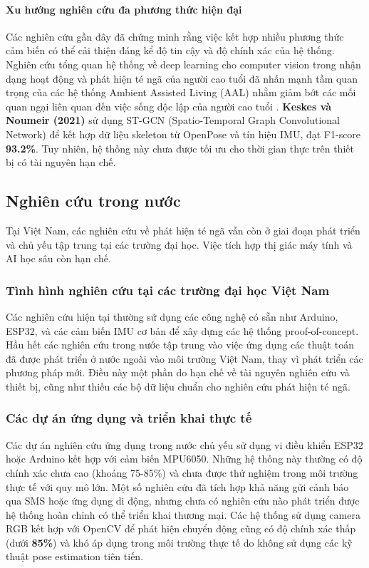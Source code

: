 \paragraph{Xu hướng nghiên cứu đa phương thức hiện đại}
Các nghiên cứu gần đây đã chứng minh rằng việc kết hợp nhiều phương thức cảm biến có thể cải thiện đáng kể độ tin cậy và độ chính xác của hệ thống. Nghiên cứu tổng quan hệ thống về deep learning cho computer vision trong nhận dạng hoạt động và phát hiện té ngã của người cao tuổi đã nhấn mạnh tầm quan trọng của các hệ thống Ambient Assisted Living (AAL) nhằm giảm bớt các mối quan ngại liên quan đến việc sống độc lập của người cao tuổi \cite{keskes2021}. \textbf{Keskes và Noumeir (2021)} sử dụng ST-GCN (Spatio-Temporal Graph Convolutional Network) để kết hợp dữ liệu skeleton từ OpenPose và tín hiệu IMU, đạt F1-score \textbf{93.2\%}. Tuy nhiên, hệ thống này chưa được tối ưu cho thời gian thực trên thiết bị có tài nguyên hạn chế.

\subsection{Nghiên cứu trong nước}
Tại Việt Nam, các nghiên cứu về phát hiện té ngã vẫn còn ở giai đoạn phát triển và chủ yếu tập trung tại các trường đại học. Việc tích hợp thị giác máy tính và AI học sâu còn hạn chế.

\subsubsection{Tình hình nghiên cứu tại các trường đại học Việt Nam}
Các nghiên cứu hiện tại thường sử dụng các công nghệ có sẵn như Arduino, ESP32, và các cảm biến IMU cơ bản để xây dựng các hệ thống proof-of-concept. Hầu hết các nghiên cứu trong nước tập trung vào việc ứng dụng các thuật toán đã được phát triển ở nước ngoài vào môi trường Việt Nam, thay vì phát triển các phương pháp mới. Điều này một phần do hạn chế về tài nguyên nghiên cứu và thiết bị, cũng như thiếu các bộ dữ liệu chuẩn cho nghiên cứu phát hiện té ngã.

\subsubsection{Các dự án ứng dụng và triển khai thực tế}
Các dự án nghiên cứu ứng dụng trong nước chủ yếu sử dụng vi điều khiển ESP32 hoặc Arduino kết hợp với cảm biến MPU6050. Những hệ thống này thường có độ chính xác chưa cao (khoảng 75-85\%) và chưa được thử nghiệm trong môi trường thực tế với quy mô lớn. Một số nghiên cứu đã tích hợp khả năng gửi cảnh báo qua SMS hoặc ứng dụng di động, nhưng chưa có nghiên cứu nào phát triển được hệ thống hoàn chỉnh có thể triển khai thương mại. Các hệ thống sử dụng camera RGB kết hợp với OpenCV để phát hiện chuyển động cũng có độ chính xác thấp (dưới \textbf{85\%}) và khó áp dụng trong môi trường thực tế do không sử dụng các kỹ thuật pose estimation tiên tiến.


